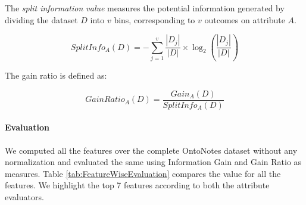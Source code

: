 The \textit{split information value} measures the potential information generated by dividing the dataset $D$ into $v$ bins, corresponding to $v$ outcomes on attribute $A$.

\begin{equation}
SplitInfo_A(D) = -\sum_{j=1}^{v}\frac{|D_j|}{|D|} \times \log_2\left(\frac{|D_j|}{|D|}\right)
\end{equation}

The gain ratio is defined as:

\begin{equation}
GainRatio_A(D) = \frac{Gain_A(D)}{SplitInfo_A(D)}
\end{equation}

\paragraph{Evaluation}
We computed all the features over the complete OntoNotes dataset without any normalization and evaluated the same using Information Gain and Gain Ratio as measures. Table \ref{tab:FeatureWiseEvaluation} compares the value for all the features. We highlight the top 7 features according to both the attribute evaluators.

